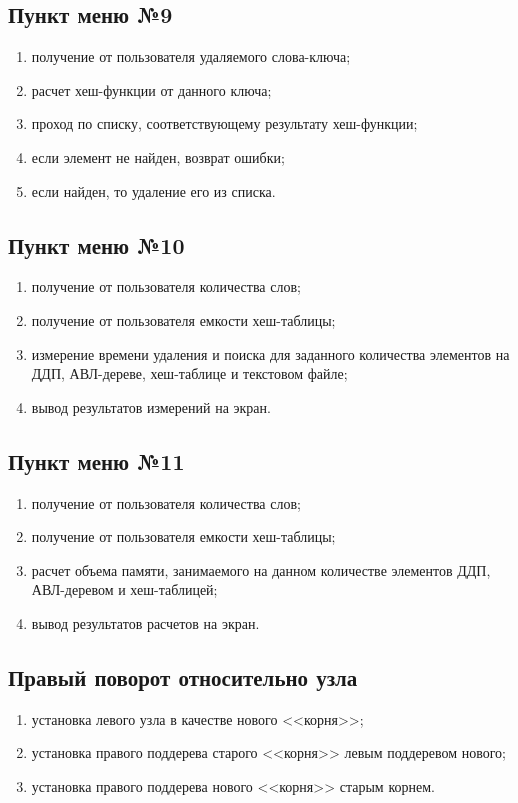 \documentclass[a4paper,12pt]{extarticle}
\begin{document}
\subsection{Пункт меню №9}
\begin{enumerate}
    \item получение от пользователя удаляемого слова-ключа;
    \item расчет хеш-функции от данного ключа;
    \item проход по списку, соответствующему результату хеш-функции;
    \item если элемент не найден, возврат ошибки;
    \item если найден, то удаление его из списка.

\end{enumerate}

\subsection{Пункт меню №10}
\begin{enumerate}
    \item получение от пользователя количества слов;
    \item получение от пользователя емкости хеш-таблицы;
    \item измерение времени удаления и поиска для заданного количества элементов на ДДП, АВЛ-дереве, хеш-таблице и текстовом файле;
    \item вывод результатов измерений на экран.
\end{enumerate}

\subsection{Пункт меню №11}
\begin{enumerate}
    \item получение от пользователя количества слов;
    \item получение от пользователя емкости хеш-таблицы;
    \item расчет объема памяти, занимаемого на данном количестве элементов ДДП, АВЛ-деревом и хеш-таблицей;
    \item вывод результатов расчетов на экран.
\end{enumerate}

\subsection{Правый поворот относительно узла}
\begin{enumerate}
	\item установка левого узла в качестве нового <<корня>>;
	\item установка правого поддерева старого <<корня>> левым поддеревом нового;
	\item установка правого поддерева нового <<корня>> старым корнем.
\end{enumerate}
\end{document}
